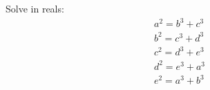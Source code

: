 Solve in reals: \begin{eqnarray*}a^2=b^3+c^3 \\ b^2=c^3+d^3 \\ c^2=d^3+e^3 \\ d^2=e^3+a^3 \\ e^2=a^3+b^3 \end{eqnarray*}